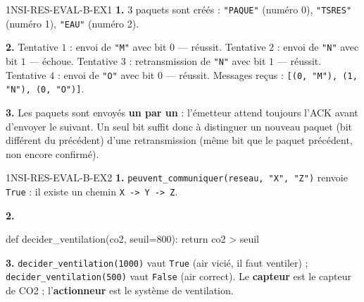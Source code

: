 \begin{corrige}{1NSI-RES-EVAL-B-EX1}
\textbf{1.} $3$ paquets sont créés : \lstinline{"PAQUE"} (numéro 0), \lstinline{"TSRES"}
(numéro 1), \lstinline{"EAU"} (numéro 2).

\textbf{2.} Tentative $1$ : envoi de \lstinline{"M"} avec bit $0$ — réussit. Tentative
$2$ : envoi de \lstinline{"N"} avec bit $1$ — échoue. Tentative $3$ : retransmission de
\lstinline{"N"} avec bit $1$ — réussit. Tentative $4$ : envoi de \lstinline{"O"} avec bit
$0$ — réussit. Messages reçus : \lstinline{[(0, "M"), (1, "N"), (0, "O")]}.

\textbf{3.} Les paquets sont envoyés \textbf{un par un} : l'émetteur attend toujours l'ACK
avant d'envoyer le suivant. Un seul bit suffit donc à distinguer \og un nouveau paquet \fg{}
(bit différent du précédent) d'\og une retransmission \fg{} (même bit que le paquet
précédent, non encore confirmé).
\end{corrige}

\begin{corrige}{1NSI-RES-EVAL-B-EX2}
\textbf{1.} \lstinline{peuvent_communiquer(reseau, "X", "Z")} renvoie \lstinline{True} :
il existe un chemin \lstinline{X -> Y -> Z}.

\textbf{2.}
\begin{python}
def decider_ventilation(co2, seuil=800):
    return co2 > seuil
\end{python}

\textbf{3.} \lstinline{decider_ventilation(1000)} vaut \lstinline{True} (air vicié, il
faut ventiler) ; \lstinline{decider_ventilation(500)} vaut \lstinline{False} (air
correct). Le \textbf{capteur} est le capteur de CO2 ; l'\textbf{actionneur} est le système
de ventilation.
\end{corrige}
